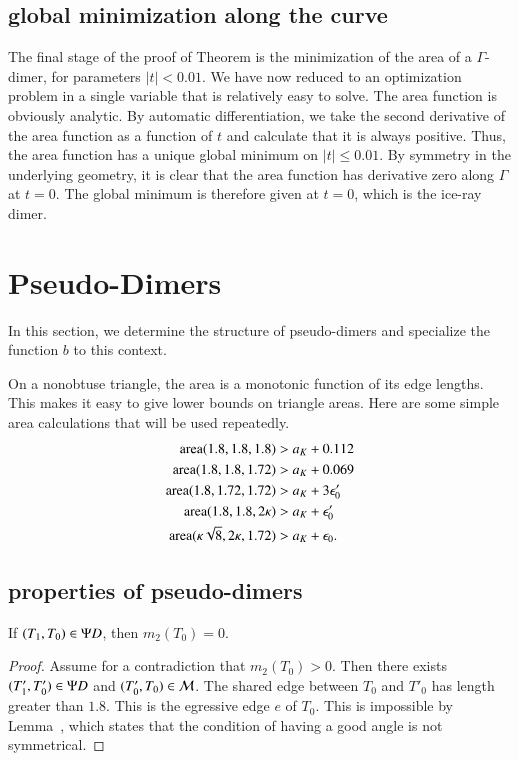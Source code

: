 \subsection{global minimization along the curve}

The final stage of the proof of Theorem  is the minimization of the area of a $\Gamma$-dimer,
for parameters $|t|<0.01$.    We have now reduced to an optimization problem in a single variable 
that is relatively easy to solve.  The area function is obviously analytic.
By automatic differentiation, we take the second derivative of the area
function as a function of $t$ and calculate that it is always positive.  Thus, the area function has a unique
global minimum on $|t|\le 0.01$.  
By symmetry in the underlying geometry, 
it is clear that the area function has derivative zero along $\Gamma$ at
$t=0$.  The global minimum is therefore given at $t=0$, which is the ice-ray dimer.

\section{Pseudo-Dimers}

In this section, we determine the structure of pseudo-dimers and specialize
the function $b$ to this context.

On a nonobtuse triangle, the area is a monotonic function of its edge lengths.
This makes it easy to give lower bounds on triangle areas.
Here are some simple    area calculations that will be used repeatedly.
\begin{align*}
{\operatorname{area}}(1.8,1.8,1.8) &> a_K + 0.112\\
{\operatorname{area}}(1.8,1.8,1.72) &> a_K + 0.069\\
{\operatorname{area}}(1.8,1.72,1.72) &> a_K + 3\epsilon_0'\\
{\operatorname{area}}(1.8,1.8,2\kappa) &> a_K + \epsilon_0'\\
{\operatorname{area}}(\kappa\sqrt8,2\kappa,1.72) &> a_K +\epsilon_0.
\end{align*}


\subsection{properties of pseudo-dimers}

\begin{lemma}  If $(T_1,T_0)\in\Psi D$, then $m_2(T_0)=0$.
\end{lemma}

\begin{proof} Assume for a contradiction that $m_2(T_0)>0$.  Then there exists $(T'_1,T_0')\in\Psi D$ and
$(T'_0,T_0)\in\mathcal M$.  The shared edge between $T_0$ and $T'_0$ has length greater than $1.8$.
This is the egressive edge $e$ of $T_0$.  This is impossible by Lemma~, which states
that the condition of having a good angle is not symmetrical.
\end{proof}

